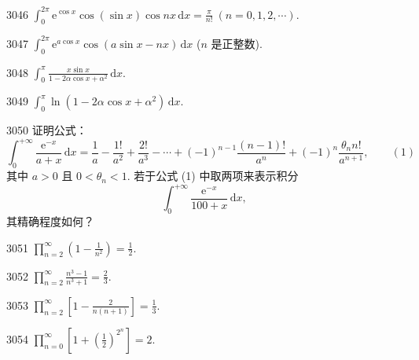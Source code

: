 \begin{prob}[S]{3046}
$\displaystyle \int_{0}^{2\pi} \mathrm{e}^{\cos x} \cos(\sin x) \cos nx\,\mathrm{d}x = \frac{\pi}{n!} \ (n = 0, 1, 2, \cdots)$.
\end{prob}


\begin{prob}[S]{3047}
$\displaystyle \int_{0}^{2\pi} \mathrm{e}^{a\cos x} \cos(a\sin x - nx)\,\mathrm{d}x$ ($n$ 是正整数).
\end{prob}

\begin{prob}[M]{3048}
$\displaystyle \int_{0}^{\pi} \frac{x\sin x}{1 - 2\alpha\cos x + \alpha^{2}}\,\mathrm{d}x$. 
\end{prob}

\begin{prob}[S]{3049}
$\displaystyle \int_{0}^{\pi} \ln(1 - 2\alpha\cos x + \alpha^{2})\,\mathrm{d}x$.
\end{prob}

\begin{prob}[M]{3050}
证明公式：
\[
\int_{0}^{+\infty} \frac{\mathrm{e}^{-x}}{a+x}\,\mathrm{d}x = \frac{1}{a} - \frac{1!}{a^{2}} + \frac{2!}{a^{3}} - \cdots + (-1)^{n-1} \frac{(n-1)!}{a^{n}} + (-1)^{n} \frac{\theta_{n} n!}{a^{n+1}}, \qquad (1)
\]
其中 $a > 0$ 且 $0 < \theta_{n} < 1$. 若于公式 (1) 中取两项来表示积分
\[
\int_{0}^{+\infty} \frac{\mathrm{e}^{-x}}{100+x}\,\mathrm{d}x,
\]
其精确程度如何？
\end{prob}



\begin{prob}[S]{3051}
$\displaystyle \prod_{n=2}^{\infty} \left(1 - \frac{1}{n^{2}}\right) = \frac{1}{2}$.
\end{prob}

\begin{prob}[S]{3052}
$\displaystyle \prod_{n=2}^{\infty} \frac{n^{3}-1}{n^{3}+1} = \frac{2}{3}$.
\end{prob}

\begin{prob}[S]{3053}
$\displaystyle \prod_{n=2}^{\infty} \left[1 - \frac{2}{n(n+1)}\right] = \frac{1}{3}$.
\end{prob}

\begin{prob}[S]{3054}
$\displaystyle \prod_{n=0}^{\infty} \left[1 + \left(\frac{1}{2}\right)^{2^{n}}\right] = 2$.
\end{prob}

